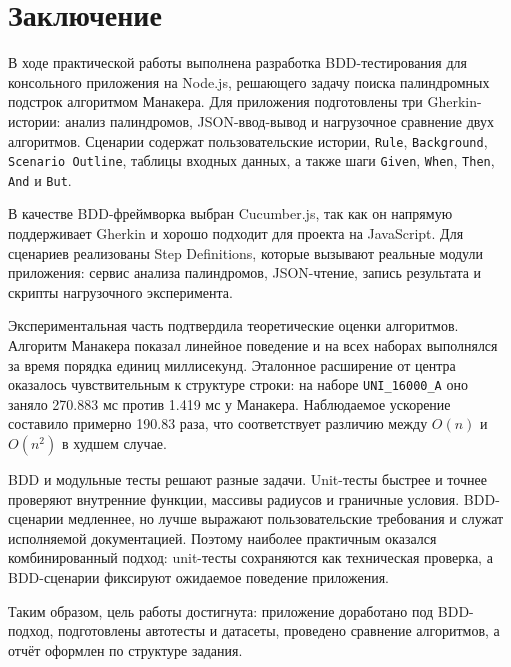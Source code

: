 \chapter*{Заключение} \label{ch-conclusion}

В ходе практической работы выполнена разработка BDD-тестирования для консольного приложения на Node.js, решающего задачу поиска палиндромных подстрок алгоритмом Манакера. Для приложения подготовлены три Gherkin-истории: анализ палиндромов, JSON-ввод-вывод и нагрузочное сравнение двух алгоритмов. Сценарии содержат пользовательские истории, \texttt{Rule}, \texttt{Background}, \texttt{Scenario Outline}, таблицы входных данных, а также шаги \texttt{Given}, \texttt{When}, \texttt{Then}, \texttt{And} и \texttt{But}.

В качестве BDD-фреймворка выбран Cucumber.js, так как он напрямую поддерживает Gherkin и хорошо подходит для проекта на JavaScript. Для сценариев реализованы Step Definitions, которые вызывают реальные модули приложения: сервис анализа палиндромов, JSON-чтение, запись результата и скрипты нагрузочного эксперимента.

Экспериментальная часть подтвердила теоретические оценки алгоритмов. Алгоритм Манакера показал линейное поведение и на всех наборах выполнялся за время порядка единиц миллисекунд. Эталонное расширение от центра оказалось чувствительным к структуре строки: на наборе \texttt{UNI\_16000\_A} оно заняло 270.883 мс против 1.419 мс у Манакера. Наблюдаемое ускорение составило примерно 190.83 раза, что соответствует различию между $O(n)$ и $O(n^2)$ в худшем случае.

BDD и модульные тесты решают разные задачи. Unit-тесты быстрее и точнее проверяют внутренние функции, массивы радиусов и граничные условия. BDD-сценарии медленнее, но лучше выражают пользовательские требования и служат исполняемой документацией. Поэтому наиболее практичным оказался комбинированный подход: unit-тесты сохраняются как техническая проверка, а BDD-сценарии фиксируют ожидаемое поведение приложения.

Таким образом, цель работы достигнута: приложение доработано под BDD-подход, подготовлены автотесты и датасеты, проведено сравнение алгоритмов, а отчёт оформлен по структуре задания.
